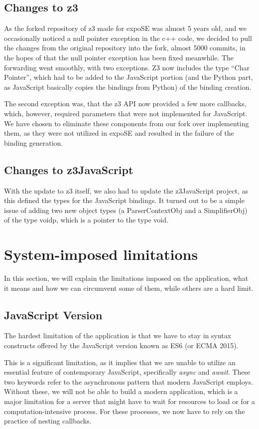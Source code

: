 \subsection{Changes to z3}
\label{sec:changes-z3}
As the forked repository of z3 made for expoSE was almost 5 years old, and we occasionally noticed a null pointer exception in the c++ code, we decided to pull the changes from the original repository into the fork, almost 5000 commits, in the hopes of that the null pointer exception has been fixed meanwhile. 
The forwarding went smoothly, with two exceptions. Z3 now includes the type “Char Pointer”, which had to be added to the JavaScript portion (and the Python part, as JavaScript basically copies the bindings from Python) of the binding creation.

The second exception was, that the z3 API now provided a few more callbacks, which, however, required parameters that were not implemented for JavaScript. We have chosen to eliminate these components from our fork over implementing them, as they were not utilized in expoSE and resulted in the failure of the binding generation.

\subsection{Changes to z3JavaScript}
\label{sec:changes-z3js}
With the update to z3 itself, we also had to update the z3JavaScript project, as this defined the types for the JavaScript bindings. It turned out to be a simple issue of adding two new object types (a ParserContextObj and a SimplifierObj) of the type voidp, which is a pointer to the type void.


\section{System-imposed limitations}
\label{sec:limits}
In this section, we will explain the limitations imposed on the application, what it means and how we can circumvent  some of them, while others are a hard  limit.
\subsection{JavaScript Version}
\label{sec:jsversion}
The hardest limitation of the application is that we have to stay in syntax constructs offered by the JavaScript version known as ES6 (or ECMA 2015).

This is a significant limitation, as it implies that we are unable to utilize an essential feature of contemporary JavaScript, specifically \textit{async} and \textit{await}. These two keywords refer to the asynchronous pattern that modern JavaScript employs. Without these, we will not be able to build a modern application, which is a major limitation for a server that might have to wait for resources to load or for a computation-intensive process. For these processes, we now have to rely on the practice of nesting callbacks. 




